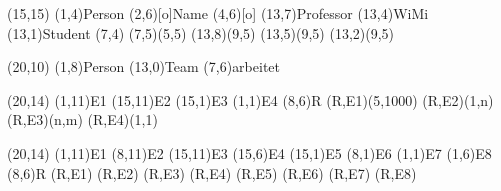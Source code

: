 \documentclass[a4paper,11pt]{article}
\begin{document}
\setlength{\unitlength}{.6cm}
\begin{schema}(15,15)
  \entity(1,4){Person}
  \attr(2,6)[o]{Name}
  \attr(4,6)[o]{}
  \relation(13,7){Professor}
  \relation(13,4){WiMi}
  \relation(13,1){Student}
  \cluster(7,4){}
  \connection(7,5)(5,5){}
  \connection(13,8)(9,5){}
  \connection(13,5)(9,5){}
  \connection(13,2)(9,5){}
\end{schema}


\begin{schema}(20,10)
  \entity(1,8){Person}
  \entity(13,0){Team}
  \relation(7,6){arbeitet}
\end{schema}

\begin{schema}(20,14)
  \entity(1,11){E1}
  \entity(15,11){E2}
  \entity(15,1){E3}
  \entity(1,1){E4}
  \relation(8,6){R}
  \conn(R,E1){(5,1000)}
  \conn(R,E2){(1,n)}
  \conn(R,E3){(n,m)}
  \conn(R,E4){(1,1)}
\end{schema}

\begin{schema}(20,14)
  \entity(1,11){E1}
  \entity(8,11){E2}
  \entity(15,11){E3}
  \entity(15,6){E4}
  \entity(15,1){E5}
  \entity(8,1){E6}
  \entity(1,1){E7}
  \entity(1,6){E8}
  \relation(8,6){R}
  \conn(R,E1){}
  \conn(R,E2){}
  \conn(R,E3){}
  \conn(R,E4){}
  \conn(R,E5){}
  \conn(R,E6){}
  \conn(R,E7){}
  \conn(R,E8){}
\end{schema}
\end{document}
